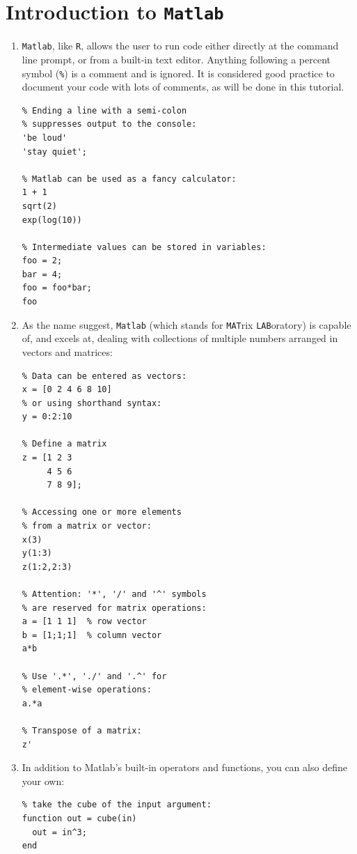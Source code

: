 \documentclass{book}
\begin{document}
\section{Introduction to \texttt{Matlab}}
\label{sec:Matlab}

\begin{enumerate}
\item \texttt{Matlab}, like \texttt{R}, allows the user to run code
  either directly at the command line prompt, or from a built-in text
  editor. Anything following a percent symbol (\texttt{\%}) is a
  comment and is ignored. It is considered good practice to document
  your code with lots of comments, as will be done in this tutorial.
  
\begin{verbatim}
% Ending a line with a semi-colon 
% suppresses output to the console:
'be loud'
'stay quiet';

% Matlab can be used as a fancy calculator:
1 + 1
sqrt(2)
exp(log(10))

% Intermediate values can be stored in variables:
foo = 2;
bar = 4;
foo = foo*bar;
foo
\end{verbatim}

\item As the name suggest, \texttt{Matlab} (which stands for
  \texttt{MAT}rix \texttt{LAB}oratory) is capable of, and excels at,
  dealing with collections of multiple numbers arranged in vectors and
  matrices:

\begin{verbatim}
% Data can be entered as vectors:
x = [0 2 4 6 8 10]
% or using shorthand syntax:
y = 0:2:10

% Define a matrix
z = [1 2 3
     4 5 6
     7 8 9];

% Accessing one or more elements 
% from a matrix or vector:
x(3)
y(1:3)
z(1:2,2:3)

% Attention: '*', '/' and '^' symbols
% are reserved for matrix operations:
a = [1 1 1]  % row vector
b = [1;1;1]  % column vector
a*b

% Use '.*', './' and '.^' for 
% element-wise operations:
a.*a

% Transpose of a matrix:
z'
\end{verbatim}

\item In addition to Matlab's built-in operators and functions, you
  can also define your own:
  
\begin{verbatim}
% take the cube of the input argument:
function out = cube(in)
  out = in^3;
end
\end{verbatim}


\end{enumerate}
\end{document}
